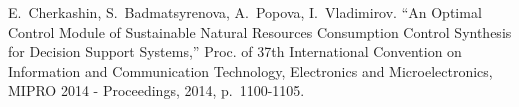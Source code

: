\documentclass[conference]{IEEEtran}
\begin{document}
\begin{thebibliography}{999}
     E.~Cherkashin, S.~Badmatsyrenova, A.~Popova, I.~Vladimirov. ``An Optimal Control Module of Sustainable Natural Resources Consumption Control Synthesis for Decision Support Systems,'' Proc. of 37th International Convention on Information and Communication Technology, Electronics and Microelectronics, MIPRO 2014 - Proceedings, 2014, p.~1100-1105.

\end{thebibliography}
\end{document}
